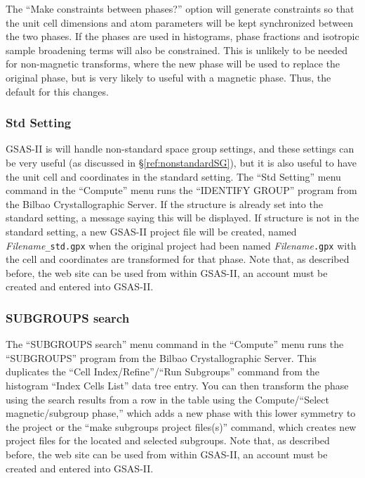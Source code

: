 The ``Make constraints between phases?'' option will generate constraints so that the unit cell dimensions and atom parameters will be kept synchronized between the two phases. If the phases are used in histograms, phase fractions and isotropic sample broadening terms will also be constrained. This is unlikely to be needed for non-magnetic transforms, where the new phase will be used to replace the original phase, but is very likely to useful with a magnetic phase. Thus, the default for this changes. 

\subsubsection{Std Setting}
GSAS-II is will handle non-standard space group settings, and these settings can be very useful (as discussed in \S\ref{ref:nonstandardSG}), but it is also useful to have the unit cell and coordinates in the standard setting. 
The ``Std Setting'' menu command in the ``Compute'' menu runs the ``IDENTIFY GROUP'' program  from the Bilbao Crystallographic Server. 
If the structure is already set into the standard setting, a message saying this will be displayed. 
If structure is not in the standard setting, a new GSAS-II project file will be created, named \textit{Filename}\texttt{\_std.gpx} when the original project had been named \textit{Filename}\texttt{.gpx} with the cell and coordinates are transformed for that phase. 
Note that, as described before, the web site can be used from within GSAS-II, an account must be created and entered into GSAS-II. 

\subsubsection{SUBGROUPS search}
The ``SUBGROUPS search'' menu command in the ``Compute'' menu runs the ``SUBGROUPS'' program from the Bilbao Crystallographic Server. This duplicates the ``Cell Index/Refine''/``Run Subgroups'' command from the histogram ``Index Cells List'' data tree entry. 
You can then transform the phase using the search results from a row in the table using the Compute/``Select magnetic/subgroup phase,'' which adds a new phase with this lower symmetry to the project or the ``make subgroups project files(s)'' command, which creates new project files for the located and selected subgroups. 
Note that, as described before, the web site can be used from within GSAS-II, an account must be created and entered into GSAS-II. 

